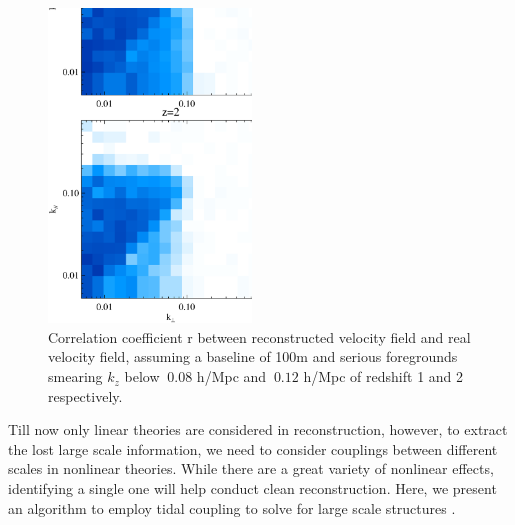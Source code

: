 \begin{figure}[tbp]
\begin{center}
\includegraphics[width=0.48\textwidth]{figure/powv2d_z1z2_r15r10.eps}
\end{center}
\vspace{-0.7cm}
    \caption{Correlation coefficient r between reconstructed velocity field and real velocity field, 
    assuming a baseline of 100m and serious foregrounds 
    smearing $k_z$ below $~0.08$ h/Mpc and $~0.12$ h/Mpc of redshift 1 and 2 respectively. 
}
\label{fig:v}
\end{figure}

Till now only linear theories are considered in reconstruction, 
however, to extract the lost large scale information, 
we need to consider couplings between different scales in nonlinear theories. 
While there are a great variety of nonlinear effects, 
identifying a single one will help conduct clean reconstruction.   
Here, we present an algorithm to employ 
tidal coupling 
to solve for large scale structures 
\cite{2015:zhu,2012:pen}.  

